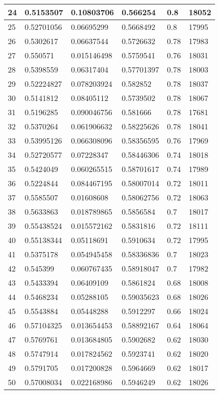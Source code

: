 \begin{longtable}{|l|l|l|l|l|l|}
24 & 0.5153507 & 0.10803706 & 0.566254 & 0.8 & 18052 \\ \hline 
25 & 0.52701056 & 0.06695299 & 0.5668492 & 0.8 & 17995 \\ \hline 
26 & 0.5302617 & 0.06637544 & 0.5726632 & 0.78 & 17983 \\ \hline 
27 & 0.550571 & 0.015146498 & 0.5759541 & 0.76 & 18031 \\ \hline 
28 & 0.5398559 & 0.06317404 & 0.57701397 & 0.78 & 18003 \\ \hline 
29 & 0.52224827 & 0.078203924 & 0.582852 & 0.78 & 18037 \\ \hline 
30 & 0.5141812 & 0.08405112 & 0.5739502 & 0.78 & 18067 \\ \hline 
31 & 0.5196285 & 0.090046756 & 0.581666 & 0.78 & 17681 \\ \hline 
32 & 0.5370264 & 0.061906632 & 0.58225626 & 0.78 & 18041 \\ \hline 
33 & 0.53995126 & 0.066308096 & 0.58356595 & 0.76 & 17969 \\ \hline 
34 & 0.52720577 & 0.07228347 & 0.58446306 & 0.74 & 18018 \\ \hline 
35 & 0.5424049 & 0.060265515 & 0.58701617 & 0.74 & 17989 \\ \hline 
36 & 0.5224844 & 0.084467195 & 0.58007014 & 0.72 & 18011 \\ \hline 
37 & 0.5585507 & 0.01608608 & 0.58062756 & 0.72 & 18063 \\ \hline 
38 & 0.5633863 & 0.018789865 & 0.5856584 & 0.7 & 18017 \\ \hline 
39 & 0.55438524 & 0.015572162 & 0.5831816 & 0.72 & 18111 \\ \hline 
40 & 0.55138344 & 0.05118691 & 0.5910634 & 0.72 & 17995 \\ \hline 
41 & 0.5375178 & 0.054945458 & 0.58336836 & 0.7 & 18023 \\ \hline 
42 & 0.545399 & 0.060767435 & 0.58918047 & 0.7 & 17982 \\ \hline 
43 & 0.5433394 & 0.06409109 & 0.5861824 & 0.68 & 18008 \\ \hline 
44 & 0.5468234 & 0.05288105 & 0.59035623 & 0.68 & 18026 \\ \hline 
45 & 0.5543884 & 0.05448288 & 0.5912297 & 0.66 & 18024 \\ \hline 
46 & 0.57104325 & 0.013654453 & 0.58892167 & 0.64 & 18064 \\ \hline 
47 & 0.5769761 & 0.013684805 & 0.5902682 & 0.62 & 18030 \\ \hline 
48 & 0.5747914 & 0.017824562 & 0.5923741 & 0.62 & 18020 \\ \hline 
49 & 0.5791705 & 0.017200828 & 0.5964669 & 0.62 & 18017 \\ \hline 
50 & 0.57008034 & 0.022168986 & 0.5946249 & 0.62 & 18026 \\ \hline 
\end{longtable}